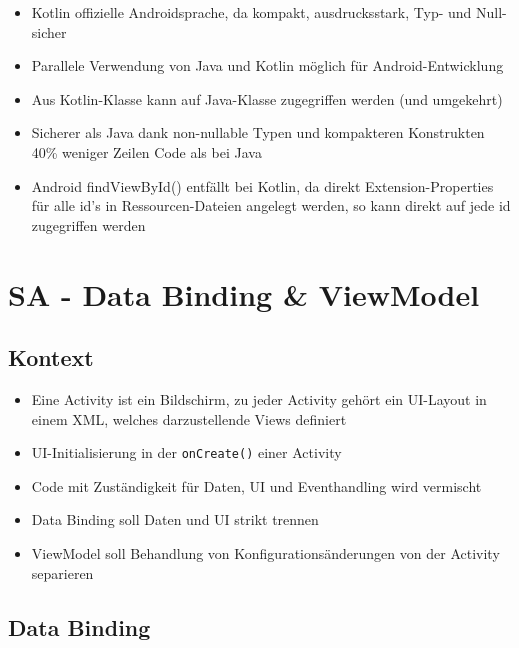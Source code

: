 \documentclass[a4paper]{article}
\begin{document}
		\begin{itemize}
			\item Kotlin offizielle Androidsprache, da kompakt, ausdrucksstark, Typ- und Null-sicher
			\item Parallele Verwendung von Java und Kotlin möglich für Android-Entwicklung
			\item Aus Kotlin-Klasse kann auf Java-Klasse zugegriffen werden (und umgekehrt)
			\item Sicherer als Java dank non-nullable Typen und kompakteren Konstrukten \\
				40\% weniger Zeilen Code als bei Java
			\item Android findViewById() entfällt bei Kotlin, da direkt Extension-Properties für alle id's in Ressourcen-Dateien angelegt werden, so kann direkt auf jede id zugegriffen werden
		\end{itemize}
		
	\section{SA - Data Binding \& ViewModel}
	
		\subsection{Kontext}
		
		\begin{itemize}
			\item Eine Activity ist ein Bildschirm, zu jeder Activity gehört ein UI-Layout in einem XML, welches darzustellende Views definiert
			\item UI-Initialisierung in der \texttt{onCreate()} einer Activity
			\item Code mit Zuständigkeit für Daten, UI und Eventhandling wird vermischt
			\item Data Binding soll Daten und UI strikt trennen
			\item ViewModel soll Behandlung von Konfigurationsänderungen von der Activity separieren
		\end{itemize}
	
		\subsection{Data Binding}
		
\end{document}
